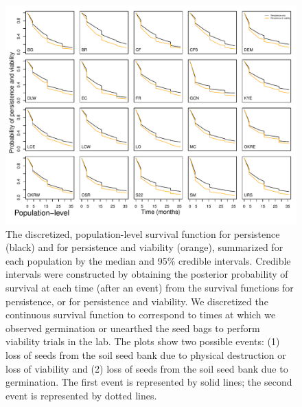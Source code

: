\documentclass[12pt, oneside]{article}   	%
\begin{document}
 \begin{figure}[!h]
   \centering
       \includegraphics[page=3,width=1\textwidth]{../../figures/survival-function-persistence-viability.pdf}  
    \caption{ The discretized, population-level survival function for persistence (black) and for persistence and viability (orange), summarized for each population by the median and 95\% credible intervals.  Credible intervals were constructed by obtaining the posterior probability of survival at each time (after an event) from the survival functions for persistence, or for persistence and viability. We discretized the continuous survival function to correspond to times at which we observed germination or unearthed the seed bags to perform viability trials in the lab. The plots show two possible events: (1) loss of seeds from the soil seed bank due to physical destruction or loss of viability and (2) loss of seeds from the soil seed bank due to germination. The first event is represented by solid lines; the second event is represented by dotted lines. }
 \label{fig:viability-estimates-population}
\end{figure}


\end{document}
